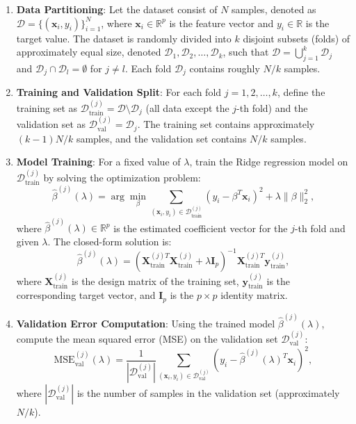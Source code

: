 \documentclass{article}
\begin{document}
\begin{enumerate}
    \item \textbf{Data Partitioning}: 
    Let the dataset consist of \(N\) samples, denoted as \(\mathcal{D} = \{(\mathbf{x}_i, y_i)\}_{i=1}^N\), where \(\mathbf{x}_i \in \mathbb{R}^p\) is the feature vector and \(y_i \in \mathbb{R}\) is the target value. The dataset is randomly divided into \(k\) disjoint subsets (folds) of approximately equal size, denoted \(\mathcal{D}_1, \mathcal{D}_2, \ldots, \mathcal{D}_k\), such that \(\mathcal{D} = \bigcup_{j=1}^k \mathcal{D}_j\) and \(\mathcal{D}_j \cap \mathcal{D}_l = \emptyset\) for \(j \neq l\). Each fold \(\mathcal{D}_j\) contains roughly \(N/k\) samples.

    \item \textbf{Training and Validation Split}: 
    For each fold \(j = 1, 2, \ldots, k\), define the training set as \(\mathcal{D}_{\text{train}}^{(j)} = \mathcal{D} \setminus \mathcal{D}_j\) (all data except the \(j\)-th fold) and the validation set as \(\mathcal{D}_{\text{val}}^{(j)} = \mathcal{D}_j\). The training set contains approximately \((k-1)N/k\) samples, and the validation set contains \(N/k\) samples.

    \item \textbf{Model Training}: 
    For a fixed value of \(\lambda\), train the Ridge regression model on \(\mathcal{D}_{\text{train}}^{(j)}\) by solving the optimization problem:
    \[
    \hat{\beta}^{(j)}(\lambda) = \arg\min_{\beta} \sum_{(\mathbf{x}_i, y_i) \in \mathcal{D}_{\text{train}}^{(j)}} \left( y_i - \beta^T \mathbf{x}_i \right)^2 + \lambda \|\beta\|_2^2,
    \]
    where \(\hat{\beta}^{(j)}(\lambda) \in \mathbb{R}^p\) is the estimated coefficient vector for the \(j\)-th fold and given \(\lambda\). The closed-form solution is:
    \[
    \hat{\beta}^{(j)}(\lambda) = \left( \mathbf{X}_{\text{train}}^{(j)T} \mathbf{X}_{\text{train}}^{(j)} + \lambda \mathbf{I}_p \right)^{-1} \mathbf{X}_{\text{train}}^{(j)T} \mathbf{y}_{\text{train}}^{(j)},
    \]
    where \(\mathbf{X}_{\text{train}}^{(j)}\) is the design matrix of the training set, \(\mathbf{y}_{\text{train}}^{(j)}\) is the corresponding target vector, and \(\mathbf{I}_p\) is the \(p \times p\) identity matrix.

    \item \textbf{Validation Error Computation}: 
    Using the trained model \(\hat{\beta}^{(j)}(\lambda)\), compute the mean squared error (MSE) on the validation set \(\mathcal{D}_{\text{val}}^{(j)}\):
    \[
    \text{MSE}_{\text{val}}^{(j)}(\lambda) = \frac{1}{|\mathcal{D}_{\text{val}}^{(j)}|} \sum_{(\mathbf{x}_i, y_i) \in \mathcal{D}_{\text{val}}^{(j)}} \left( y_i - \hat{\beta}^{(j)}(\lambda)^T \mathbf{x}_i \right)^2,
    \]
    where \(|\mathcal{D}_{\text{val}}^{(j)}|\) is the number of samples in the validation set (approximately \(N/k\)).


\end{enumerate}
\end{document}
